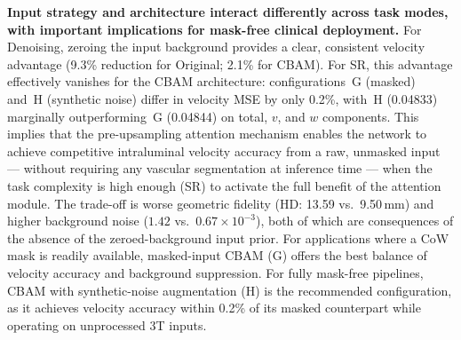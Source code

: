 \textbf{Input strategy and architecture interact differently across task modes, with important
implications for mask-free clinical deployment.}  For Denoising, zeroing the input background
provides a clear, consistent velocity advantage (9.3\% reduction for Original; 2.1\% for CBAM).
For SR, this advantage effectively vanishes for the CBAM architecture: configurations~G (masked)
and~H (synthetic noise) differ in velocity MSE by only 0.2\%, with~H (0.04833) marginally
outperforming~G (0.04844) on total, $v$, and $w$ components.  This implies that the
pre-upsampling attention mechanism enables the network to achieve competitive intraluminal
velocity accuracy from a raw, unmasked input --- without requiring any vascular segmentation at
inference time --- when the task complexity is high enough (SR) to activate the full benefit of
the attention module.  The trade-off is worse geometric fidelity (HD: 13.59 vs.\ 9.50\,mm) and
higher background noise ($1.42$ vs.\ $0.67{\times}10^{-3}$), both of which are consequences of
the absence of the zeroed-background input prior.  For applications where a CoW mask is readily
available, masked-input CBAM (G) offers the best balance of velocity accuracy and background
suppression.  For fully mask-free pipelines, CBAM with synthetic-noise augmentation (H) is the
recommended configuration, as it achieves velocity accuracy within 0.2\% of its masked
counterpart while operating on unprocessed 3T inputs.

\label{sec:velocity}



